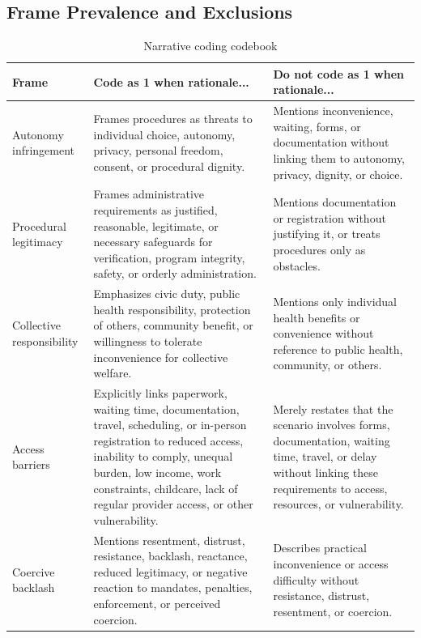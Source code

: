 \subsection{Frame Prevalence and Exclusions}

\begin{table}[htbp]
\centering
\caption{Narrative coding codebook}
\label{tab:narrative-codebook}
\begin{tabular*}{\textwidth}{@{\extracolsep{\fill}}L{3.2cm}L{5.9cm}L{5.9cm}@{}}
\toprule
Frame & Code as 1 when rationale... & Do not code as 1 when rationale... \\
\midrule
Autonomy infringement &
Frames procedures as threats to individual choice, autonomy, privacy, personal freedom, consent, or procedural dignity. &
Mentions inconvenience, waiting, forms, or documentation without linking them to autonomy, privacy, dignity, or choice. \\

Procedural legitimacy &
Frames administrative requirements as justified, reasonable, legitimate, or necessary safeguards for verification, program integrity, safety, or orderly administration. &
Mentions documentation or registration without justifying it, or treats procedures only as obstacles. \\

Collective responsibility &
Emphasizes civic duty, public health responsibility, protection of others, community benefit, or willingness to tolerate inconvenience for collective welfare. &
Mentions only individual health benefits or convenience without reference to public health, community, or others. \\

Access barriers &
Explicitly links paperwork, waiting time, documentation, travel, scheduling, or in-person registration to reduced access, inability to comply, unequal burden, low income, work constraints, childcare, lack of regular provider access, or other vulnerability. &
Merely restates that the scenario involves forms, documentation, waiting time, travel, or delay without linking these requirements to access, resources, or vulnerability. \\

Coercive backlash &
Mentions resentment, distrust, resistance, backlash, reactance, reduced legitimacy, or negative reaction to mandates, penalties, enforcement, or perceived coercion. &
Describes practical inconvenience or access difficulty without resistance, distrust, resentment, or coercion. \\
\bottomrule
\end{tabular*}
\end{table}

